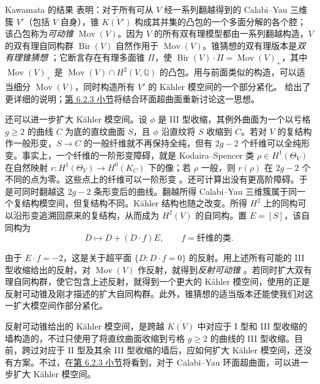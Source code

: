 Kawamata 的结果  表明：对于所有可从 $V$ 经一系列翻越得到的 Calabi--Yau 三维簇 $V'$（包括 $V$ 自身），锥 $\overline{K(V')}$ 构成其并集的凸包的一个多面分解的各个腔；该凸包称为\emph{可动锥} $\operatorname{Mov}(V)$。因为 $V$ 的所有双有理模型都由一系列翻越构造，$V$ 的双有理自同构群 $\operatorname{Bir}(V)$ 自然作用于 $\operatorname{Mov}(V)$。锥猜想的双有理版本是\emph{双有理锥猜想} ；它断言存在有理多面锥 $\Pi$，使
$\operatorname{Bir}(V)\cdot\Pi=\operatorname{Mov}(V)_+$，其中 $\operatorname{Mov}(V)_+$ 是 $\operatorname{Mov}(V)\cap H^2(V,\mathbb Q)$ 的凸包。用与前面类似的构造，可以适当细分 $\operatorname{Mov}(V)$，同时构造所有 $V'$ 的 Kähler 模空间的一个部分紧化。 给出了更详细的说明；\hyperref[subsec:enlarged-kahler-moduli]{第 6.2.3 小节}将结合环面超曲面重新讨论这一思想。

还可以进一步扩大 Kähler 模空间。设 $\phi$ 是 III 型收缩，其例外曲面为一个以亏格 $g\geq2$ 的曲线 $C$ 为底的直纹曲面 $S$，且 $\phi$ 沿直纹将 $S$ 收缩到 $C$。若对 $V$ 的复结构作一般形变，$S\to C$ 的一般纤维就不再保持全纯，但有 $2g-2$ 个纤维可以全纯形变。事实上，一个纤维的一阶形变障碍，就是 Kodaira--Spencer 类 $\rho\in H^1(\Theta_V)$ 在自然映射
$r:H^1(\Theta_V)\to H^0(K_C)$ 下的像；若 $\rho$ 一般，则 $r(\rho)$ 在 $2g-2$ 个不同的点为零。这些点上的纤维可以一阶形变 。还可计算出没有更高阶障碍。于是可同时翻越这 $2g-2$ 条形变后的曲线。翻越所得 Calabi--Yau 三维簇属于同一个复结构模空间，但复结构不同。Kähler 结构也随之改变。所得 $H^2$ 上的同构可以沿形变追溯回原来的复结构，从而成为 $H^2(V)$ 的自同构。置 $E=[S]$，该自同构为
\[
D\longmapsto D+(D\cdot f)E,\qquad f=\text{纤维的类}.
\]

由于 $E\cdot f=-2$，这是关于超平面 $\{D:D\cdot f=0\}$ 的反射。用上述所有可能的 III 型收缩给出的反射，对 $\operatorname{Mov}(V)$ 作反射，就得到\emph{反射可动锥} 。若同时扩大双有理自同构群，使它包含上述反射，就得到一个更大的 Kähler 模空间，使用的正是反射可动锥及刚才描述的扩大自同构群。此外，锥猜想的适当版本还能使我们对这一扩大模空间作部分紧化。

反射可动锥给出的 Kähler 模空间，是跨越 $\overline{K(V)}$ 中对应于 I 型和 III 型收缩的墙构造的，不过只使用了将直纹曲面收缩到亏格 $g\geq2$ 的曲线的 III 型收缩。目前，跨过对应于 II 型及其余 III 型收缩的墙后，应如何扩大 Kähler 模空间，还没有方案。不过，在\hyperref[subsec:enlarged-kahler-moduli]{第 6.2.3 小节}将看到，对于 Calabi--Yau 环面超曲面，可以进一步扩大 Kähler 模空间。

